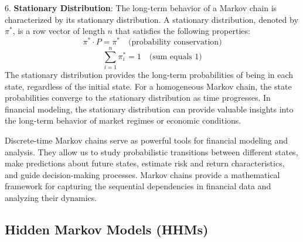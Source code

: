 \documentclass[a4paper,11pt]{article}
\begin{document}
6. \textbf{Stationary Distribution}: The long-term behavior of a Markov chain is characterized by its stationary distribution. A stationary distribution, denoted by $\pi^*$, is a row vector of length $n$ that satisfies the following properties:
\[
\pi^* \cdot P = \pi^* \quad \text{(probability conservation)}
\]
\[
\sum_{i=1}^{n} \pi^*_i = 1 \quad \text{(sum equals 1)}
\]
The stationary distribution provides the long-term probabilities of being in each state, regardless of the initial state. For a homogeneous Markov chain, the state probabilities converge to the stationary distribution as time progresses. In financial modeling, the stationary distribution can provide valuable insights into the long-term behavior of market regimes or economic conditions.

Discrete-time Markov chains serve as powerful tools for financial modeling and analysis. They allow us to study probabilistic transitions between different states, make predictions about future states, estimate risk and return characteristics, and guide decision-making processes. Markov chains provide a mathematical framework for capturing the sequential dependencies in financial data and analyzing their dynamics.

\subsection{Hidden Markov Models (HHMs)}
\label{sec:HHM}
\end{document}
